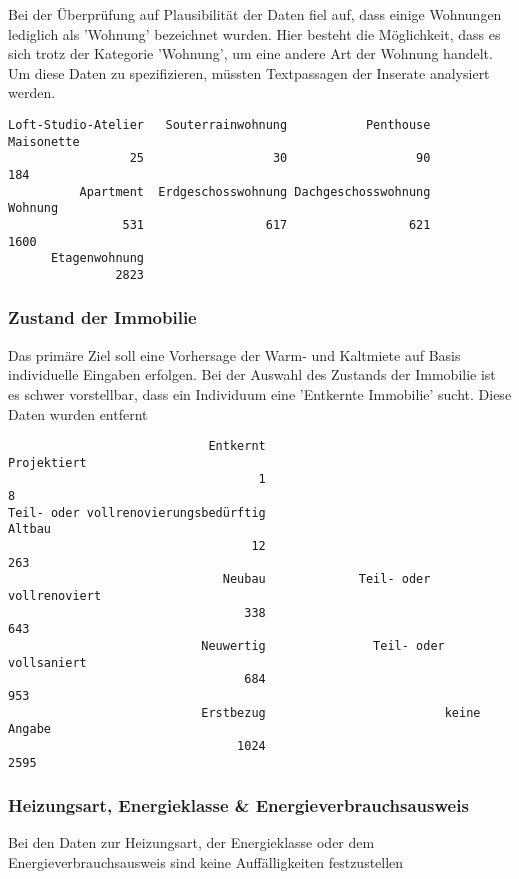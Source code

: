 Bei der Überprüfung auf Plausibilität der Daten fiel auf, dass einige Wohnungen lediglich als 'Wohnung' bezeichnet wurden. Hier besteht die Möglichkeit, dass es sich trotz der Kategorie 'Wohnung', um eine andere Art der Wohnung handelt. Um diese Daten zu spezifizieren, müssten Textpassagen der Inserate analysiert werden.

\begin{verbatim}
Loft-Studio-Atelier   Souterrainwohnung           Penthouse          Maisonette 
                 25                  30                  90                 184 
          Apartment  Erdgeschosswohnung Dachgeschosswohnung             Wohnung 
                531                 617                 621                1600 
      Etagenwohnung 
               2823 
\end{verbatim}


\subsubsection{Zustand der Immobilie}
Das primäre Ziel soll eine Vorhersage der Warm- und Kaltmiete auf Basis individuelle Eingaben erfolgen. Bei der Auswahl des Zustands der Immobilie ist es schwer vorstellbar, dass ein Individuum eine 'Entkernte Immobilie' sucht. Diese Daten wurden entfernt
\begin{verbatim}
                            Entkernt                          Projektiert 
                                   1                                    8 
Teil- oder vollrenovierungsbedürftig                               Altbau 
                                  12                                  263 
                              Neubau             Teil- oder vollrenoviert 
                                 338                                  643 
                           Neuwertig               Teil- oder vollsaniert 
                                 684                                  953 
                           Erstbezug                         keine Angabe 
                                1024                                 2595
\end{verbatim}

\subsubsection{Heizungsart, Energieklasse \& Energieverbrauchsausweis }
Bei den Daten zur Heizungsart, der Energieklasse oder dem Energieverbrauchsausweis sind keine Auffälligkeiten festzustellen

